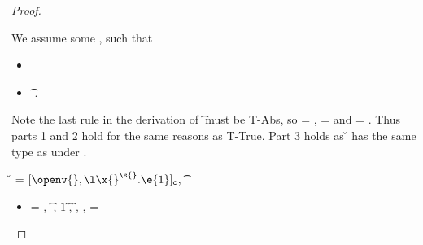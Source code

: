 \begin{lemma}
\begin{proof}
\begin{case}[B-Abs]
\begin{itemize}
\begin{subcase}[T-Clos]
        We assume some \propenvp{}, such that
        \begin{itemize}
          \item \satisfies{\openv{}}{\propenvp{}}
          \item \judgement {\propenvp{}} {\abs {\x{}} {\s{}} {}} {\t{}}
                           {\filterset {\thenprop {\prop{}}}
                                       {\elseprop {\prop{}}}}
                           {\object{}}.
       \end{itemize}
       Note the last rule in the derivation of
          \judgement {\propenvp{}} {\abs {\x{}} {\s{}} {}} {\t{}}
                           {\filterset {\thenprop {\prop{}}}
                                       {\elseprop {\prop{}}}}
                           {\object{}}
                           must be T-Abs, so 
                           {\thenprop {\prop{}}} = {\topprop{}},
                           {\elseprop {\prop{}}} = {\botprop{}}
                           and {\object{}} = {\emptyobject{}}.
         Thus parts 1 and 2 hold for the same reasons as T-True.
         Part 3 holds as \v{} has the same type as {\abs {\x{}} {\s{}} {}}
         under \propenvp{}.

      \end{subcase} 
  \end{itemize}
\end{case}

\begin{case}[B-Abs]
        \v{} = ${\closure {\openv{}} {\abs {\x{}} {\s{}} {\e{1}}}}$,
          { \opsem {\openv{}}
                   {\abs {\x{}} {\t{}} {}}
                   {\closure {\openv{}} {\abs {\x{}} {\s{}} {}}}}

  \begin{itemize}
    \item[]
      \begin{subcase}[T-Abs]
  \ep{} = {\abs {\x{}} {\s{}} {}},
{ \judgementrewrite {\propenv{}, {\isprop {\s{}} {\x{}}}}
            {} {\t{}}
             {
                         {}}
             {}
             {}},
           \issubtypein{}
           {\ArrowOne {\x{}} {\s{}}
                      {\t{1}}
                      {
                                  {}}
                      {}}
          {\t{}},
          \inpropenv{\topprop{}}{\thenprop{\prop{}}},
          \inpropenv{\botprop{}}{\elseprop{\prop{}}},
          {\object{}} = {\emptyobject{}}


\end{subcase}
\end{itemize}
\end{case}
\end{proof}
\end{lemma}
